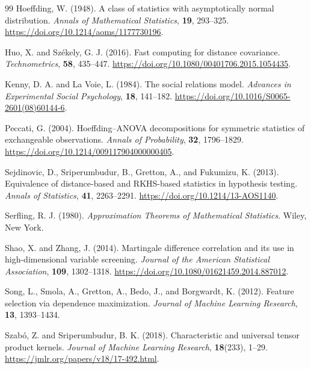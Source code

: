 \documentclass[11pt]{article}
\theoremstyle{plain}
\theoremstyle{definition}
\theoremstyle{remark}
\begin{document}
\begin{thebibliography}{99}
Hoeffding, W. (1948).
A class of statistics with asymptotically normal distribution.
\emph{Annals of Mathematical Statistics}, \textbf{19}, 293--325.
 \url{https://doi.org/10.1214/aoms/1177730196}.


Huo, X. and Sz\'ekely, G. J. (2016).
Fast computing for distance covariance.
\emph{Technometrics}, \textbf{58}, 435--447.
\url{https://doi.org/10.1080/00401706.2015.1054435}.

Kenny, D. A. and La Voie, L. (1984).
The social relations model.
\emph{Advances in Experimental Social Psychology}, \textbf{18}, 141--182.
\url{https://doi.org/10.1016/S0065-2601(08)60144-6}.

Peccati, G. (2004).
Hoeffding--ANOVA decompositions for symmetric statistics of exchangeable
observations.
\emph{Annals of Probability}, \textbf{32}, 1796--1829.
\url{https://doi.org/10.1214/009117904000000405}.

Sejdinovic, D., Sriperumbudur, B., Gretton, A., and Fukumizu, K. (2013).
Equivalence of distance-based and RKHS-based statistics in hypothesis testing.
\emph{Annals of Statistics}, \textbf{41}, 2263--2291.
\url{https://doi.org/10.1214/13-AOS1140}.

Serfling, R. J. (1980).
\emph{Approximation Theorems of Mathematical Statistics}.
Wiley, New York.

Shao, X. and Zhang, J. (2014).
Martingale difference correlation and its use in high-dimensional variable
screening.
\emph{Journal of the American Statistical Association}, \textbf{109},
1302--1318.
\url{https://doi.org/10.1080/01621459.2014.887012}.

Song, L., Smola, A., Gretton, A., Bedo, J., and Borgwardt, K. (2012).
Feature selection via dependence maximization.
\emph{Journal of Machine Learning Research}, \textbf{13}, 1393--1434.

Szab\'o, Z. and Sriperumbudur, B. K. (2018).
Characteristic and universal tensor product kernels.
\emph{Journal of Machine Learning Research}, \textbf{18}(233), 1--29.
\url{https://jmlr.org/papers/v18/17-492.html}.


\end{thebibliography}
\end{document}
